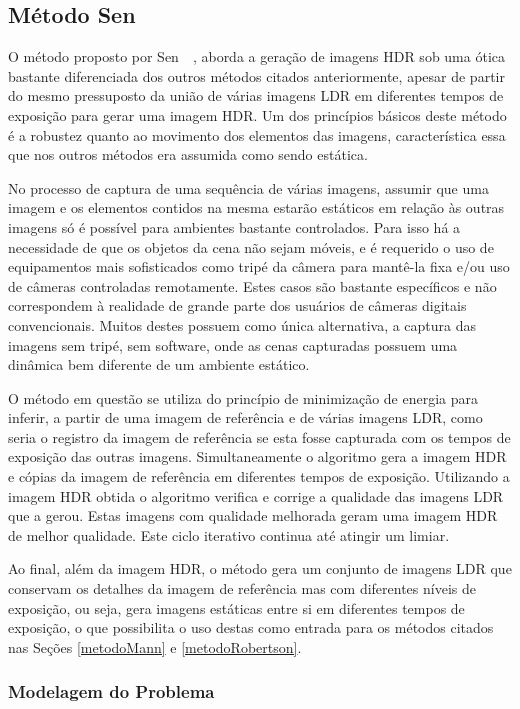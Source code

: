 \subsection{Método Sen} \label{metodoSen}

O método proposto por Sen~\etal~\cite{hdrMovimento}, aborda a geração de imagens HDR sob uma ótica bastante diferenciada dos outros métodos citados anteriormente, apesar de partir do mesmo pressuposto da união de várias imagens LDR em diferentes tempos de exposição para gerar uma imagem HDR. Um dos princípios básicos deste método é a robustez quanto ao movimento dos elementos das imagens, característica essa que nos outros métodos era assumida como sendo estática.

No processo de captura de uma sequência de várias imagens, assumir que uma imagem e os elementos contidos na mesma estarão estáticos em relação às outras imagens só é possível para ambientes bastante controlados. Para isso há a necessidade de que os objetos da cena não sejam móveis, e é requerido o uso de equipamentos mais sofisticados como tripé da câmera para mantê-la fixa e/ou uso de câmeras controladas remotamente. Estes casos são bastante específicos e não correspondem à realidade de grande parte dos usuários de câmeras digitais convencionais. Muitos destes possuem como única alternativa, a captura das imagens sem tripé, sem software, onde as cenas capturadas possuem uma dinâmica bem diferente de um ambiente estático.

O método em questão se utiliza do princípio de minimização de energia para inferir, a partir de uma imagem de referência e de várias imagens LDR, como seria o registro da imagem de referência se esta fosse capturada com os tempos de exposição das outras imagens. Simultaneamente o algoritmo gera a imagem HDR e cópias da imagem de referência em diferentes tempos de exposição. Utilizando a imagem HDR obtida o algoritmo verifica e corrige a qualidade das imagens LDR que a gerou. Estas imagens com qualidade melhorada geram uma imagem HDR de melhor qualidade. Este ciclo iterativo continua até atingir um limiar.

Ao final, além da imagem HDR, o método gera um conjunto de imagens LDR que conservam os detalhes da imagem de referência mas com diferentes níveis de exposição, ou seja, gera imagens estáticas entre si em diferentes tempos de exposição, o que possibilita o uso destas como entrada para os métodos citados nas Seções \ref{metodoMann} e \ref{metodoRobertson}.

\subsubsection{Modelagem do Problema} \label{MetodoSenModelo}

